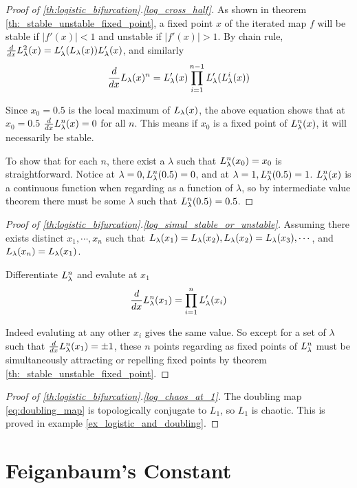 \begin{proof}[Proof of \ref{th:logistic_bifurcation}.\ref{log_cross_half}]
	As shown in theorem \ref{th:_stable_unstable_fixed_point}, a fixed point $x$ of the iterated map $f$ will be stable if $|f'(x)| < 1$ and unstable if $|f'(x)| > 1$.
	By chain rule, 
	$\frac{d}{dx}L_{\lambda}^2 (x) = L_{\lambda}'(L_{\lambda}(x))L_{\lambda}'(x)$, and similarly
	$$
		\frac{d}{dx} L_{\lambda}(x)^n = L_{\lambda}'(x)\prod_{i=1}^{n-1} L_{\lambda}'(L_{\lambda}^i(x))
	$$

	Since $x_0 = 0.5$ is the local maximum of $L_{\lambda}(x)$, the above equation shows that at $x_0 = 0.5$ $\frac{d}{dx} L_{\lambda}^n(x) = 0$ for all $n$.
	This means if $x_0$ is a fixed point of $L_{\lambda}^n(x)$, it will necessarily be stable. 
	
	To show that for each $n$, there exist a $\lambda$ such that $L_{\lambda}^n(x_0) = x_0$ is straightforward. 
	Notice at $\lambda = 0, L_{\lambda}^n(0.5) = 0$, and at $\lambda = 1, L_{\lambda}^n(0.5) = 1$.
	$L_{\lambda}^n(x)$ is a continuous function when regarding as a function of $\lambda$, so by intermediate value theorem there must be some $\lambda$ such that $L_{\lambda}^n(0.5) = 0.5$.
\end{proof}

\begin{proof}[Proof of \ref{th:logistic_bifurcation}.\ref{log_simul_stable_or_unstable}]
		Assuming there exists distinct $x_1, \cdots, x_n$ such that $L_{\lambda}(x_1) = L_{\lambda}(x_2), L_{\lambda}(x_2) = L_{\lambda}(x_3), \cdots $, and $L_{\lambda}(x_n) = L_{\lambda}(x_1)$.

		Differentiate $L_{\lambda}^n$ and evalute at $x_1$ 
		$$
		\frac{d}{dx} L_{\lambda}^n(x_1) = \prod_{i=1}^n L_{\lambda}'(x_i)
		$$

		Indeed evaluting at any other $x_i$ gives the same value. 
		So except for a set of $\lambda$ such that $\frac{d}{dx} L_{\lambda}^n(x_1) = \pm 1$, these $n$ points regarding as fixed points of $L_{\lambda}^n$ must be simultaneously attracting or repelling fixed points by theorem \ref{th:_stable_unstable_fixed_point}.
\end{proof}

\begin{proof}[Proof of \ref{th:logistic_bifurcation}.\ref{log_chaos_at_1}]
	The doubling map \eqref{eq:doubling_map} is topologically conjugate to $L_{1}$, so $L_1$ is chaotic.
	This is proved in example \ref{ex_logistic_and_doubling}.
\end{proof}

\section{Feiganbaum's Constant}


